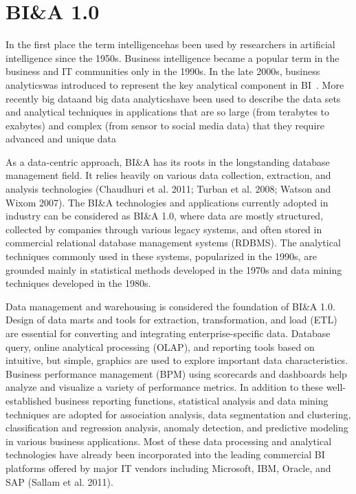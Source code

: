\section{BI\&A 1.0}
In the first place the term intelligencehas been used by researchers in
artificial intelligence since the 1950s. Business intelligence
became a popular term in the business and IT communities
only in the 1990s. In the late 2000s, business analyticswas
introduced to represent the key analytical component in BI~\cite{davenport:2006}. More recently big dataand big data
analyticshave been used to describe the data sets and analytical techniques in applications that are so large (from
terabytes to exabytes) and complex (from sensor to social
media data) that they require advanced and unique data

As a data-centric approach, BI\&A has its roots in the longstanding database management field. It relies heavily on
various data collection, extraction, and analysis technologies
(Chaudhuri et al. 2011; Turban et al. 2008; Watson and
Wixom 2007). The BI\&A technologies and applications
currently adopted in industry can be considered as BI\&A 1.0,
where data are mostly structured, collected by companies
through various legacy systems, and often stored in commercial relational database management systems (RDBMS). The
analytical techniques commonly used in these systems,
popularized in the 1990s, are grounded mainly in statistical
methods developed in the 1970s and data mining techniques
developed in the 1980s.

Data management and warehousing is considered the foundation of BI\&A 1.0. Design of data marts and tools for
extraction, transformation, and load (ETL) are essential for
converting and integrating enterprise-specific data. Database
query, online analytical processing (OLAP), and reporting
tools based on intuitive, but simple, graphics are used to
explore important data characteristics. Business performance
management (BPM) using scorecards and dashboards help
analyze and visualize a variety of performance metrics. In
addition to these well-established business reporting functions, statistical analysis and data mining techniques are
adopted for association analysis, data segmentation and
clustering, classification and regression analysis, anomaly
detection, and predictive modeling in various business applications. Most of these data processing and analytical technologies have already been incorporated into the leading commercial BI platforms offered by major IT vendors including
Microsoft, IBM, Oracle, and SAP (Sallam et al. 2011).

